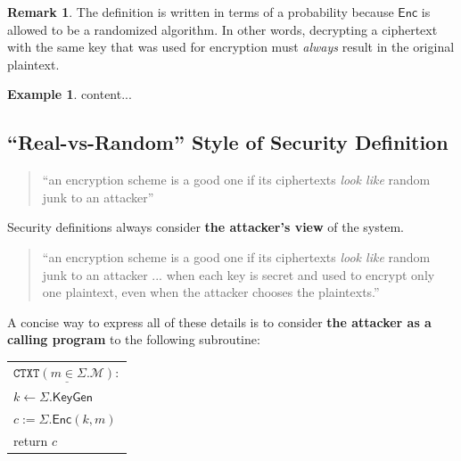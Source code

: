 \documentclass[12pt,openany]{book}
\theoremstyle{definition}
\newtheorem{remark}{Remark}[chapter]
\newtheorem{example}{Example}[chapter]
\newcommand{\KeyGen}{\mathsf{KeyGen}}
\newcommand{\Enc}{\mathsf{Enc}}
\newcommand{\scheme}{\Sigma}
\newcommand{\messagespace}{\mathcal{M}}
\newcommand{\tab}{\hspace{12pt}}
\begin{document}
	\begin{remark}
		The definition is written in terms of a probability because $\Enc$ is allowed to be a randomized algorithm. In other words, decrypting a ciphertext with the same key that was used for encryption must \textit{always} result in the original plaintext.
	\end{remark}
	\vspace{4pt}
	\begin{example}
		content...
	\end{example}
	
	\subsection{``Real-vs-Random'' Style of Security Definition}
	\begin{quote}
		``an encryption scheme is a good one if its ciphertexts \textit{look like} random junk to an attacker''
	\end{quote}

	Security definitions always consider \textbf{the attacker's view} of the system.
	\begin{quote}
		``an encryption scheme is a good one if its ciphertexts \textit{look like} random junk to an attacker ... when each key is secret and used to encrypt only one plaintext, even when the attacker chooses the plaintexts.''
	\end{quote}

	
	A concise way to express all of these details is to consider \textbf{the attacker as a calling	program} to the following subroutine:
	\begin{center}
		\begin{tabular}{|l|}
			\hline
			$\underline{\texttt{CTXT}(m\in\scheme.\messagespace):}$\\
			\tab$k\gets\scheme.\KeyGen$\\
			\tab$c:=\scheme.\Enc(k,m)$\\
			\tab return $c$\\
			\hline
		\end{tabular}\\
	\end{center}
	
\end{document}
